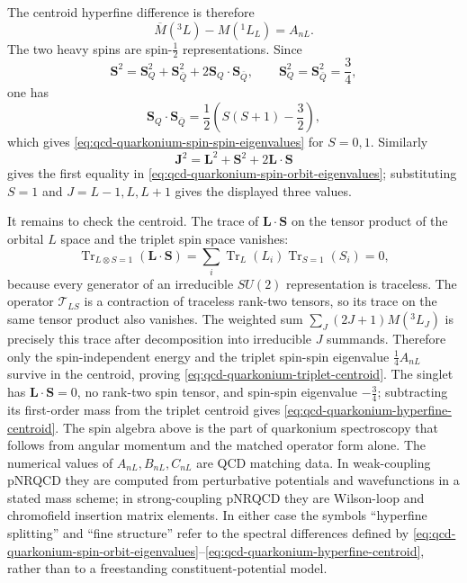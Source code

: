 The centroid hyperfine difference is therefore
\begin{equation}
  \overline M(^3L)-M(^1L_L)=A_{nL}.
  \label{eq:qcd-quarkonium-hyperfine-centroid}
\end{equation}
The two heavy spins are spin-\(\frac12\) representations.  Since
\[
  \mathbf S^2
  =
  \mathbf S_Q^2+\mathbf S_{\bar Q}^2
  +2\mathbf S_Q\cdot\mathbf S_{\bar Q},
  \qquad
  \mathbf S_Q^2=\mathbf S_{\bar Q}^2=\frac34,
\]
one has
\[
  \mathbf S_Q\cdot\mathbf S_{\bar Q}
  =
  \frac12\left(S(S+1)-\frac32\right),
\]
which gives \eqref{eq:qcd-quarkonium-spin-spin-eigenvalues} for
\(S=0,1\).  Similarly
\[
  \mathbf J^2
  =
  \mathbf L^2+\mathbf S^2+2\mathbf L\cdot\mathbf S
\]
gives the first equality in
\eqref{eq:qcd-quarkonium-spin-orbit-eigenvalues}; substituting
\(S=1\) and \(J=L-1,L,L+1\) gives the displayed three values.

It remains to check the centroid.  The trace of \(\mathbf L\cdot\mathbf S\)
on the tensor product of the orbital \(L\) space and the triplet spin space
vanishes:
\[
  \operatorname{Tr}_{L\otimes S=1}(\mathbf L\cdot\mathbf S)
  =
  \sum_i \operatorname{Tr}_{L}(L_i)\operatorname{Tr}_{S=1}(S_i)=0,
\]
because every generator of an irreducible \(SU(2)\) representation is
traceless.  The operator \(\mathcal T_{LS}\) is a contraction of traceless
rank-two tensors, so its trace on the same tensor product also vanishes.  The
weighted sum
\(\sum_J(2J+1)M(^3L_J)\) is precisely this trace after decomposition into
irreducible \(J\) summands.  Therefore only the spin-independent energy and
the triplet spin-spin eigenvalue \(\frac14A_{nL}\) survive in the centroid,
proving \eqref{eq:qcd-quarkonium-triplet-centroid}.  The singlet has
\(\mathbf L\cdot\mathbf S=0\), no rank-two spin tensor, and spin-spin
eigenvalue \(-\frac34\); subtracting its first-order mass from the triplet
centroid gives \eqref{eq:qcd-quarkonium-hyperfine-centroid}.
The spin algebra above is the part of quarkonium spectroscopy that follows
from angular momentum and the matched operator form alone.  The numerical
values of
\(A_{nL},B_{nL},C_{nL}\) are QCD matching data.  In weak-coupling pNRQCD they
are computed from perturbative potentials and wavefunctions in a stated mass
scheme; in strong-coupling pNRQCD they are Wilson-loop and chromofield
insertion matrix elements.  In either case the symbols
``hyperfine splitting'' and ``fine structure'' refer to the spectral
differences defined by
\eqref{eq:qcd-quarkonium-spin-orbit-eigenvalues}--\eqref{eq:qcd-quarkonium-hyperfine-centroid},
rather than to a freestanding constituent-potential model.

